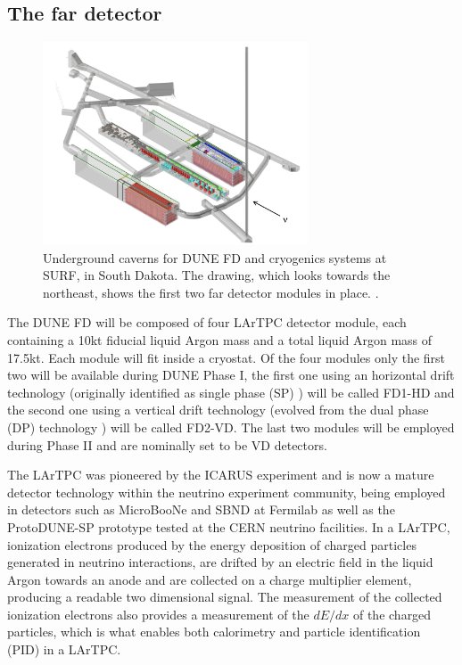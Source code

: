 \subsection{The far detector}
\begin{figure}[!ht]
     \centering
     \includegraphics[width=0.7\textwidth]{figures/ch3-DUNE/caverns_full_assembly.png}
     \caption[Underground caverns for DUNE FD and cryogenics systems at SURF, in South Dakota.]{Underground caverns for DUNE FD and cryogenics systems at SURF, in South Dakota. The drawing, which looks towards the northeast, shows the first two far detector modules in place. \cite{DUNE:2020ypp}.}
        \label{fig:FarDetectorHall}
\end{figure}
The DUNE FD will be composed of four LArTPC detector module, each containing a 10kt fiducial liquid Argon mass  and a total liquid Argon mass of 17.5kt. Each module will fit inside a cryostat. Of the four modules only the first two will be available during DUNE Phase I, the first one using an horizontal drift technology (originally identified as single phase (SP) \cite{DUNE:2020TDR4}) will be called FD1-HD and the second one using a vertical drift technology\cite{DUNE:2023TDRVD} (evolved from the dual phase (DP) technology \cite{DUNE:2018mlo}) will be called FD2-VD. The last two modules will be employed during Phase II and are nominally set to be VD detectors\cite{DUNE:2022Snowmass}.

The LArTPC was pioneered by the ICARUS experiment \cite{Rubbia:1977zz,ICARUS:2004wqc} and is now a mature detector technology within the neutrino experiment community, being employed in detectors such as MicroBooNe\cite{MicroBooNE:2016pwy} and SBND\cite{Machado:2019oxb} at Fermilab as well as the ProtoDUNE-SP\cite{DUNE:2020cqd} prototype tested at the CERN neutrino facilities. In a LArTPC, ionization electrons produced by the energy deposition of charged particles generated in neutrino interactions, are drifted by an electric field in the liquid Argon towards an anode and are collected on a charge multiplier element, producing a readable two dimensional signal. The measurement of the collected ionization electrons also provides a measurement of the $dE/dx$ of the charged particles, which is what enables both calorimetry and particle identification (PID) in a LArTPC.

